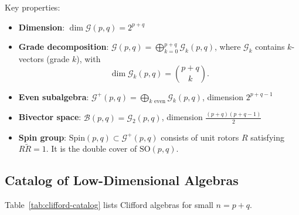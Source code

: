 \documentclass[11pt,a4paper]{article}
\numberwithin{equation}{section}
\theoremstyle{plain}
\theoremstyle{definition}
\theoremstyle{remark}
\newcommand{\Cl}{\mathcal{G}}               %
\newcommand{\rev}[1]{\widetilde{#1}}       %
\newcommand{\Biv}{\mathcal{B}}             %
\newcommand{\Spin}{\mathrm{Spin}}
\newcommand{\SO}{\mathrm{SO}}
\begin{document}
Key properties:

\begin{itemize}
\item \textbf{Dimension}: $\dim \Cl(p,q) = 2^{p+q}$

\item \textbf{Grade decomposition}: $\Cl(p,q) = \bigoplus_{k=0}^{p+q} \Cl_k(p,q)$, where $\Cl_k$ contains $k$-vectors (grade $k$), with
\begin{equation}
\dim \Cl_k(p,q) = \binom{p+q}{k}.
\end{equation}

\item \textbf{Even subalgebra}: $\Cl^+(p,q) = \bigoplus_{k \text{ even}} \Cl_k(p,q)$, dimension $2^{p+q-1}$

\item \textbf{Bivector space}: $\Biv(p,q) = \Cl_2(p,q)$, dimension $\frac{(p+q)(p+q-1)}{2}$

\item \textbf{Spin group}: $\Spin(p,q) \subset \Cl^+(p,q)$ consists of unit rotors $R$ satisfying $R\rev{R} = 1$. It is the double cover of $\SO(p,q)$.
\end{itemize}

\subsection{Catalog of Low-Dimensional Algebras}

Table~\ref{tab:clifford-catalog} lists Clifford algebras for small $n = p+q$.
\end{document}
